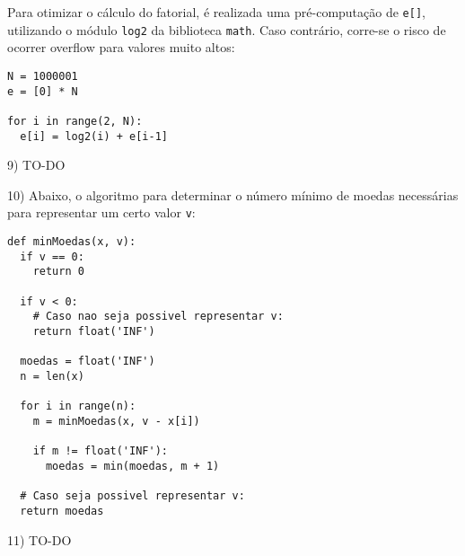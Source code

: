 \documentclass[]{article}
\begin{document}
\vspace{0.5cm}

Para otimizar o cálculo do fatorial, é realizada uma pré-computação de \texttt{e[]}, utilizando o módulo \texttt{log2} da biblioteca \texttt{math}. Caso contrário, corre-se o risco de ocorrer overflow para valores muito altos:

\begin{lstlisting}
N = 1000001
e = [0] * N

for i in range(2, N):
  e[i] = log2(i) + e[i-1] 
\end{lstlisting}

\newpage

9) TO-DO

\newpage

10) Abaixo, o algoritmo para determinar o número mínimo de moedas necessárias para representar um certo valor \texttt{v}:

\begin{lstlisting}
def minMoedas(x, v):
  if v == 0:
    return 0
    
  if v < 0:
    # Caso nao seja possivel representar v:
    return float('INF')
    
  moedas = float('INF')
  n = len(x)

  for i in range(n):
    m = minMoedas(x, v - x[i])

    if m != float('INF'):
      moedas = min(moedas, m + 1)

  # Caso seja possivel representar v:
  return moedas
\end{lstlisting}

\newpage

11) TO-DO
\end{document}
